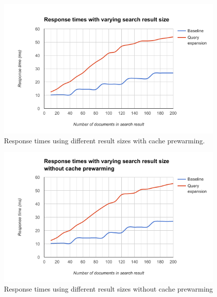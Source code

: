 \begin{figure}[h!]
  \centering \includegraphics[width=1\linewidth]{img/result-vary-result-size.png}
  \caption{Response times using different result sizes with cache prewarming.}
  \label{fig:result-vary-result-size}
\end{figure}

\begin{figure}[h!]
  \centering \includegraphics[width=1\linewidth]{img/result-vary-result-size-without-cache.png}
  \caption{Response times using different result sizes without cache prewarming}
  \label{fig:result-vary-result-size-without-cache}
\end{figure}
